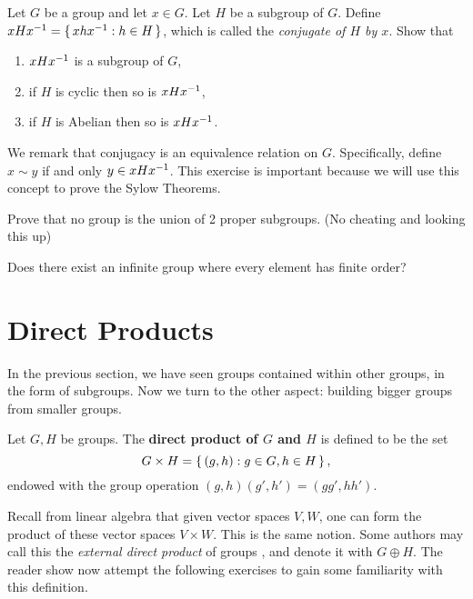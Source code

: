 \documentclass[./algebra-notes.tex]{subfiles}
\begin{document}
\begin{exercise}[Conjugates]
    Let $G$ be a group and let $x \in G$. Let $H$ be a subgroup of $G$. 
    Define $xHx^{-1} = \set{xhx^{-1}: h \in H}$, which is called the \emph{conjugate of $H$ by $x$}.
    Show that 
    \begin{enumerate}
        \item $xHx^{-1}$ is a subgroup of $G$,
        \item if $H$ is cyclic then so is $xHx^{-1}$,
        \item if $H$ is Abelian then so is $xHx^{-1}$.
    \end{enumerate}
    
    We remark that conjugacy is an equivalence relation on $G$. Specifically,
    define $x \sim y$ if and only $y \in xHx^{-1}$. This exercise is important
    because we will use this concept to prove the Sylow Theorems.
\end{exercise}


\begin{prob}
    Prove that no group is the union of 2 proper subgroups. (No cheating and
    looking this up)
\end{prob}

\begin{prob}
    Does there exist an infinite group where every element has finite order?
\end{prob}

\section{Direct Products}

In the previous section, we have seen groups contained within other groups, in
the form of subgroups. Now we turn to the other aspect: building bigger groups
from smaller groups. 

\begin{definition}
\label{def:direct-product}
    Let $G, H$ be groups. The \textbf{direct product of $G$ and $H$} is defined to be 
    the set 
    \[
        G \times H = \set{(g,h) : g \in G, h \in H},
    \]
    endowed with the group operation $(g,h)(g',h') = (gg', hh')$.
\end{definition}
Recall from linear algebra that given vector spaces $V, W$, one can form the
product of these vector spaces $V \times W$. This is the same notion. Some
authors may call this the \emph{external direct product} of groups
\autocite[Ch~8]{Gallian_2020}, and denote it with $G \oplus H$. The reader show
now attempt the following exercises to gain some familiarity with this
definition.
\end{document}
